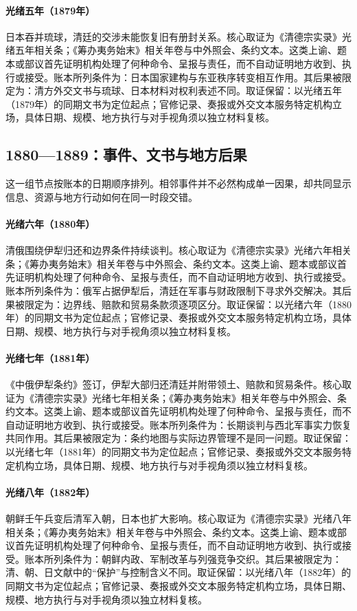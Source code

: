 \hypertarget{ledger:EQ-1879-RYUKYU-ANNEXATION}{}\paragraph{光绪五年（1879年）}日本吞并琉球，清廷的交涉未能恢复旧有册封关系。核心取证为《清德宗实录》光绪五年相关条；《筹办夷务始末》相关年卷与中外照会、条约文本。这类上谕、题本或部议首先证明机构处理了何种命令、呈报与责任，而不自动证明地方收到、执行或接受。账本所列条件为：日本国家建构与东亚秩序转变相互作用。其后果被限定为：清方外交文书与琉球、日本材料对权利表述不同。取证保留：以光绪五年（1879年）的同期文书为定位起点；官修记录、奏报或外交文本服务特定机构立场，具体日期、规模、地方执行与对手视角须以独立材料复核。
\subsection{1880—1889：事件、文书与地方后果}
这一组节点按账本的日期顺序排列。相邻事件并不必然构成单一因果，却共同显示信息、资源与地方行动如何在同一时段交错。
\hypertarget{ledger:EQ-1880-ILI-NEGOTIATIONS}{}\paragraph{光绪六年（1880年）}清俄围绕伊犁归还和边界条件持续谈判。核心取证为《清德宗实录》光绪六年相关条；《筹办夷务始末》相关年卷与中外照会、条约文本。这类上谕、题本或部议首先证明机构处理了何种命令、呈报与责任，而不自动证明地方收到、执行或接受。账本所列条件为：俄军占据伊犁后，清廷在军事与财政限制下寻求外交解决。其后果被限定为：边界线、赔款和贸易条款须逐项区分。取证保留：以光绪六年（1880年）的同期文书为定位起点；官修记录、奏报或外交文本服务特定机构立场，具体日期、规模、地方执行与对手视角须以独立材料复核。
\hypertarget{ledger:EQ-1881-SAINT-PETERSBURG-TREATY}{}\paragraph{光绪七年（1881年）}《中俄伊犁条约》签订，伊犁大部归还清廷并附带领土、赔款和贸易条件。核心取证为《清德宗实录》光绪七年相关条；《筹办夷务始末》相关年卷与中外照会、条约文本。这类上谕、题本或部议首先证明机构处理了何种命令、呈报与责任，而不自动证明地方收到、执行或接受。账本所列条件为：长期谈判与西北军事实力恢复共同作用。其后果被限定为：条约地图与实际边界管理不是同一问题。取证保留：以光绪七年（1881年）的同期文书为定位起点；官修记录、奏报或外交文本服务特定机构立场，具体日期、规模、地方执行与对手视角须以独立材料复核。
\hypertarget{ledger:EQ-1882-IMO-INCIDENT}{}\paragraph{光绪八年（1882年）}朝鲜壬午兵变后清军入朝，日本也扩大影响。核心取证为《清德宗实录》光绪八年相关条；《筹办夷务始末》相关年卷与中外照会、条约文本。这类上谕、题本或部议首先证明机构处理了何种命令、呈报与责任，而不自动证明地方收到、执行或接受。账本所列条件为：朝鲜内政、军制改革与列强竞争交织。其后果被限定为：清、朝、日文献中的“保护”与控制含义不同。取证保留：以光绪八年（1882年）的同期文书为定位起点；官修记录、奏报或外交文本服务特定机构立场，具体日期、规模、地方执行与对手视角须以独立材料复核。
